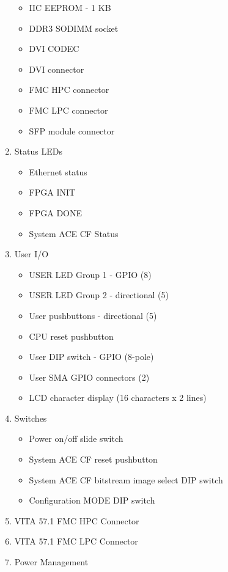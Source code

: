 \begin{enumerate}
  \begin{itemize}
    \item IIC EEPROM - 1 KB
    \item DDR3 SODIMM socket
    \item DVI CODEC
    \item DVI connector
    \item FMC HPC connector
    \item FMC LPC connector
    \item SFP module connector
  \end{itemize}

  \item Status LEDs

  \begin{itemize}
    \item Ethernet status
    \item FPGA INIT
    \item FPGA DONE
    \item System ACE CF Status
  \end{itemize}
  \item User I/O

  \begin{itemize}
    \item USER LED Group 1 - GPIO (8)
    \item USER LED Group 2 - directional (5)
    \item User pushbuttons - directional (5)
    \item CPU reset pushbutton
    \item User DIP switch - GPIO (8-pole)
    \item User SMA GPIO connectors (2)
    \item LCD character display (16 characters x 2 lines)
  \end{itemize}

  \item Switches
  \begin{itemize}
    \item Power on/off slide switch
    \item System ACE CF reset pushbutton
    \item System ACE CF bitstream image select DIP switch
    \item Configuration MODE DIP switch
  \end{itemize}

  \item VITA 57.1 FMC HPC Connector
  \item VITA 57.1 FMC LPC Connector
  \item Power Management


\end{enumerate}
